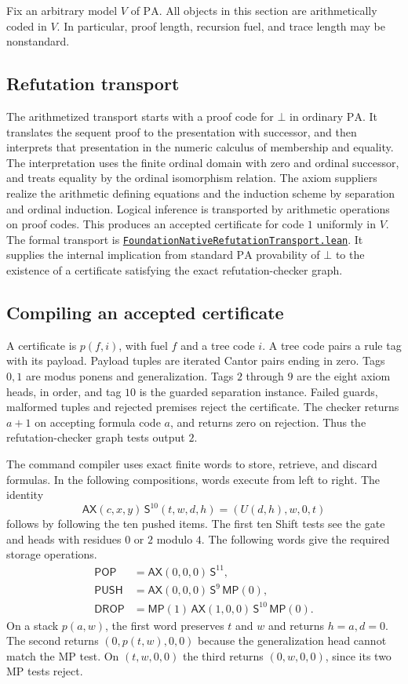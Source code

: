 \documentclass[11pt,letterpaper]{article}
\newcommand{\PA}{\mathrm{PA}}
\newcommand{\ax}{\mathsf{AX}}
\newcommand{\mpc}{\mathsf{MP}}
\newcommand{\shift}{\mathsf{S}}
\newcommand{\push}{\mathsf{PUSH}}
\newcommand{\pophead}{\mathsf{POP}}
\newcommand{\discard}{\mathsf{DROP}}
\newcommand{\src}[2]{\href{https://github.com/jamesyc/BusyBeaver/blob/main/#1}{\texttt{\nolinkurl{#2}}}}
\begin{document}
Fix an arbitrary model $V$ of $\PA$. All objects in this section are
arithmetically coded in $V$. In particular, proof length, recursion
fuel, and trace length may be nonstandard.

\subsection{Refutation transport}

The arithmetized transport starts with a proof code for $\bot$ in
ordinary $\PA$. It translates the sequent proof to the presentation
with successor, and then interprets that presentation in the numeric
calculus of membership and equality. The interpretation uses the
finite ordinal domain with zero and ordinal successor, and treats
equality by the ordinal isomorphism relation. The axiom suppliers
realize the arithmetic defining equations and the induction scheme
by separation and ordinal induction. Logical inference is
transported by arithmetic operations on proof codes. This produces
an accepted certificate for code $1$ uniformly in $V$. The formal
transport is
\src{M6PA/Calibration/FoundationNativeRefutationTransport.lean}{FoundationNativeRefutationTransport.lean}.
It supplies the internal implication from standard $\PA$ provability
of $\bot$ to the existence of a certificate satisfying the exact
refutation-checker graph.

\subsection{Compiling an accepted certificate}\label{sec:compile}

A certificate is $p(f,i)$, with fuel $f$ and a tree code $i$.
A tree code pairs a rule tag with its payload. Payload tuples are
iterated Cantor pairs ending in zero. Tags $0,1$ are modus ponens and
generalization. Tags $2$ through $9$ are the eight axiom heads,
in order, and tag $10$ is the guarded separation instance.
Failed guards, malformed tuples and rejected premises reject the
certificate. The checker returns $a+1$ on accepting formula code
$a$, and returns zero on rejection. Thus the refutation-checker
graph tests output $2$.

The command compiler uses exact finite words to store, retrieve, and
discard formulas. In the following compositions, words execute from
left to right. The identity
\[
 \ax(c,x,y)\,\shift^{10}(t,w,d,h)=(U(d,h),w,0,t)
\]
follows by following the ten pushed items. The first ten Shift tests
see the gate and heads with residues $0$ or $2$ modulo $4$. The
following words give the required storage operations.
\begin{align*}
 \pophead&=\ax(0,0,0)\,\shift^{11},\\
 \push&=\ax(0,0,0)\,\shift^9\,\mpc(0),\\
 \discard&=\mpc(1)\,\ax(1,0,0)\,\shift^{10}\,\mpc(0).
\end{align*}
On a stack $p(a,w)$, the first word preserves $t$ and $w$ and returns
$h=a,d=0$. The second returns $(0,p(t,w),0,0)$ because the
generalization head cannot match the MP test. On $(t,w,0,0)$ the
third returns $(0,w,0,0)$, since its two MP tests reject.
\end{document}
